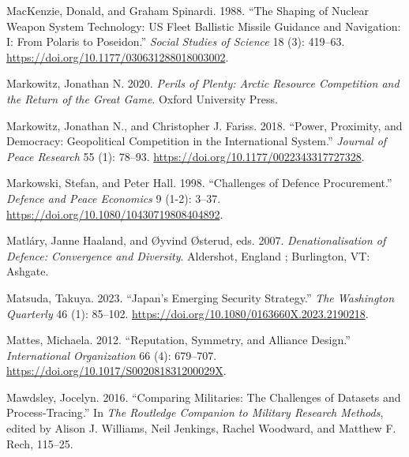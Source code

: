 \documentclass[
  12,
  letterpaper,
  DIV=11,
  numbers=noendperiod]{scrartcl}
\newlength{\cslhangindent}
\newlength{\cslentryspacingunit} %
\newenvironment{CSLReferences}[2] %
 {%
  \setlength{\parindent}{0pt}
  \ifodd #1
  \let\oldpar\par
  \def\par{\hangindent=\cslhangindent\oldpar}
  \fi
  \setlength{\parskip}{#2\cslentryspacingunit}
 }%
 {}
\begin{document}
\begin{CSLReferences}{1}{0}
\leavevmode{}%
MacKenzie, Donald, and Graham Spinardi. 1988. {``The {Shaping} of
{Nuclear Weapon System Technology}: {US Fleet Ballistic Missile
Guidance} and {Navigation}: {I}: {From Polaris} to {Poseidon}.''}
\emph{Social Studies of Science} 18 (3): 419--63.
\url{https://doi.org/10.1177/030631288018003002}.

\leavevmode{}%
Markowitz, Jonathan N. 2020. \emph{Perils of {Plenty}: {Arctic Resource
Competition} and the {Return} of the {Great Game}}. {Oxford University
Press}.

\leavevmode{}%
Markowitz, Jonathan N., and Christopher J. Fariss. 2018. {``Power,
Proximity, and Democracy: {Geopolitical} Competition in the
International System.''} \emph{Journal of Peace Research} 55 (1):
78--93. \url{https://doi.org/10.1177/0022343317727328}.

\leavevmode{}%
Markowski, Stefan, and Peter Hall. 1998. {``Challenges of Defence
Procurement.''} \emph{Defence and Peace Economics} 9 (1-2): 3--37.
\url{https://doi.org/10.1080/10430719808404892}.

\leavevmode{}%
Matláry, Janne Haaland, and Øyvind Østerud, eds. 2007.
\emph{Denationalisation of Defence: Convergence and Diversity}.
{Aldershot, England ; Burlington, VT}: {Ashgate}.

\leavevmode{}%
Matsuda, Takuya. 2023. {``Japan's {Emerging Security Strategy}.''}
\emph{The Washington Quarterly} 46 (1): 85--102.
\url{https://doi.org/10.1080/0163660X.2023.2190218}.

\leavevmode{}%
Mattes, Michaela. 2012. {``Reputation, {Symmetry}, and {Alliance
Design}.''} \emph{International Organization} 66 (4): 679--707.
\url{https://doi.org/10.1017/S002081831200029X}.

\leavevmode{}%
Mawdsley, Jocelyn. 2016. {``Comparing {Militaries}: {The Challenges} of
{Datasets} and {Process-Tracing}.''} In \emph{The {Routledge Companion}
to {Military Research Methods}}, edited by Alison J. Williams, Neil
Jenkings, Rachel Woodward, and Matthew F. Rech, 115--25.


\end{CSLReferences}
\end{document}
